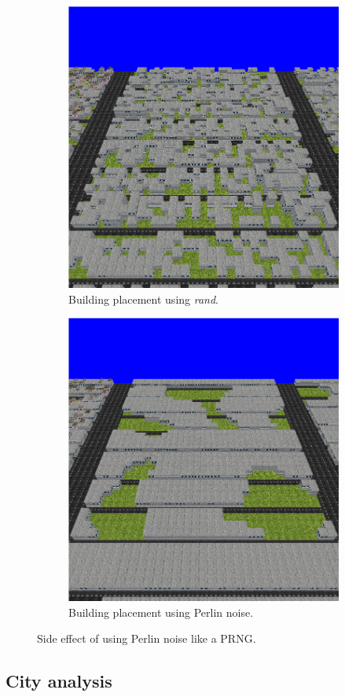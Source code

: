 	\begin{figure}[h]
		\begin{subfigure}{0.5\textwidth}
			\centering
			\includegraphics[width=0.9\linewidth]{"Images/rand vacant"}
			\caption{Building placement using \textit{rand}.}
			\label{fig:rand-vacant}
		\end{subfigure}
		\begin{subfigure}{0.5\textwidth}
			\centering
			\includegraphics[width=0.9\linewidth]{"Images/perlin vacant"}
			\caption{Building placement using Perlin noise.}
			\label{fig:perlin-vacant}
		\end{subfigure}
		\caption{Side effect of using Perlin noise like a PRNG.}
		\label{fig:perlin-rand-vacant}
	\end{figure}
	
	\subsection{City analysis}